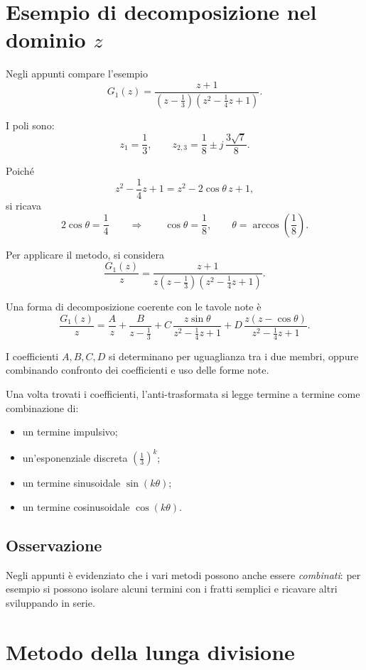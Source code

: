 \section{Esempio di decomposizione nel dominio \(z\)}

Negli appunti compare l'esempio
\[
G_1(z)=\frac{z+1}{\left(z-\frac13\right)\left(z^2-\frac14 z+1\right)}.
\]

I poli sono:
\[
z_1=\frac13,
\qquad
z_{2,3}=\frac18 \pm j\,\frac{3\sqrt7}{8}.
\]

Poich\'e
\[
z^2-\frac14 z+1
=
z^2-2\cos\theta\,z+1,
\]
si ricava
\[
2\cos\theta=\frac14
\qquad\Longrightarrow\qquad
\cos\theta=\frac18,
\qquad
\theta=\arccos\!\left(\frac18\right).
\]

Per applicare il metodo, si considera
\[
\frac{G_1(z)}{z}
=
\frac{z+1}{z\left(z-\frac13\right)\left(z^2-\frac14 z+1\right)}.
\]

Una forma di decomposizione coerente con le tavole note \`e
\[
\frac{G_1(z)}{z}
=
\frac{A}{z}
+
\frac{B}{z-\frac13}
+
C\,\frac{z\sin\theta}{z^2-\frac14 z+1}
+
D\,\frac{z(z-\cos\theta)}{z^2-\frac14 z+1}.
\]

I coefficienti \(A,B,C,D\) si determinano per uguaglianza tra i due membri,
oppure combinando confronto dei coefficienti e uso delle forme note.

Una volta trovati i coefficienti, l'anti-trasformata si legge termine a termine come combinazione di:
\begin{itemize}
    \item un termine impulsivo;
    \item un'esponenziale discreta \(\left(\frac13\right)^k\);
    \item un termine sinusoidale \(\sin(k\theta)\);
    \item un termine cosinusoidale \(\cos(k\theta)\).
\end{itemize}

\subsection*{Osservazione}

Negli appunti \`e evidenziato che i vari metodi possono anche essere \emph{combinati}:
per esempio si possono isolare alcuni termini con i fratti semplici
e ricavare altri sviluppando in serie.

\section{Metodo della lunga divisione}

